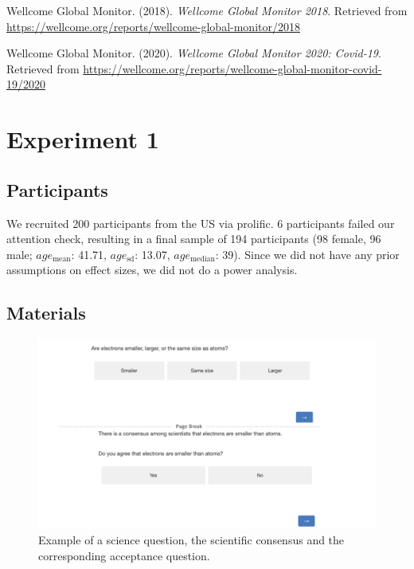 \documentclass[
  doc,floatsintext]{apa6}
\newlength{\cslhangindent}
\newenvironment{CSLReferences}[2] %
 {\begin{list}{}{%
  \setlength{\itemindent}{0pt}
  \setlength{\leftmargin}{0pt}
  \setlength{\parsep}{0pt}
  \ifodd #1
   \setlength{\leftmargin}{\cslhangindent}
   \setlength{\itemindent}{-1\cslhangindent}
  \fi
  \setlength{\itemsep}{#2\baselineskip}}}
 {\end{list}}
\begin{document}
\begin{CSLReferences}{1}{0}
Wellcome Global Monitor. (2018). \emph{Wellcome Global Monitor 2018}. Retrieved from \url{https://wellcome.org/reports/wellcome-global-monitor/2018}

Wellcome Global Monitor. (2020). \emph{Wellcome Global Monitor 2020: Covid-19}. Retrieved from \url{https://wellcome.org/reports/wellcome-global-monitor-covid-19/2020}

\end{CSLReferences}

\newpage

\appendix


\section{Experiment 1}\label{exp1}

\subsection{Participants}\label{participants-1}

We recruited 200 participants from the US via prolific. 6 participants failed our attention check, resulting in a final sample of 194 participants (98 female, 96 male; \(age_\text{mean}\): 41.71, \(age_\text{sd}\): 13.07, \(age_\text{median}\): 39). Since we did not have any prior assumptions on effect sizes, we did not do a power analysis.

\subsection{Materials}\label{materials-1}

\FloatBarrier



\begin{figure}

\includegraphics[width=1\linewidth]{./figures/study1_question_example} \hfill{}

\caption{Example of a science question, the scientific consensus and the corresponding acceptance question.}\label{fig:stimulus-example}
\end{figure}
\end{document}
